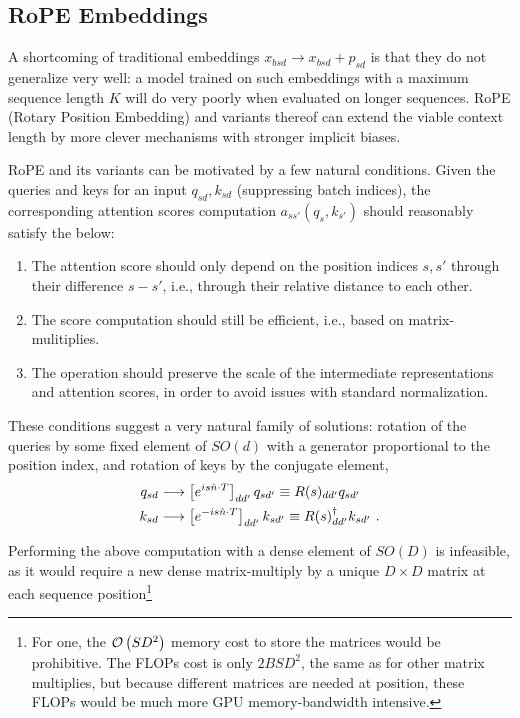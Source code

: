 \documentclass[11pt]{article}
\begin{document}
\subsection{RoPE Embeddings}

A shortcoming of traditional embeddings $ x _{ bsd } \longrightarrow x _{ bsd } + p _{ sd } $ is
that they do not generalize very well: a model trained on such embeddings with a maximum sequence
length $ K $ will do very poorly when evaluated on longer sequences. RoPE (Rotary Position
Embedding) \cite{su2022roformer} and variants thereof can extend the viable context length by more
clever mechanisms with stronger implicit biases.

RoPE and its variants can be motivated by a few natural conditions.  Given the queries and keys for
an input $ q _{ sd }, k _{ sd } $ (suppressing batch indices), the corresponding attention scores
computation $ a _{ ss' }\left ( q _{ s }, k _{ s' } \right ) $ should reasonably satisfy the below:
\begin{enumerate}
	\item The attention score should only depend on the position indices $ s, s' $ through their difference
	      $ s-s' $, i.e., through their relative distance to each other.
	\item The score computation should still be efficient, i.e., based on matrix-mulitiplies.
	\item The operation should preserve the scale of the intermediate representations and attention
	      scores, in order to avoid issues with standard normalization.
\end{enumerate}
These conditions suggest a very natural family of solutions: rotation of the queries by some fixed
element of $ SO(d) $ with a generator proportional to the position index, and rotation of keys by
the conjugate element,
\begin{align}
	q _{ sd } & \longrightarrow \left [e^{ i s \hat{n}\cdot T }\right ]_{ d d' } q _{ sd' } \equiv R(s) _{ d d' } q _{ sd' } \nonumber\\
	k _{ sd } & \longrightarrow \left [e^{ -i s \hat{n}\cdot T }\right ]_{ d d' } k _{ sd' } \equiv  R(s)^{ \dagger } _{ d d' } k _{ sd' } \ . \label{eq_rope}
\end{align}

Performing the above computation with a dense element of $ SO(D) $ is infeasible, as it would require
a new dense matrix-multiply by a unique $ D \times D $ matrix at each sequence
position\footnote{For one, the $ \mathcal{O} \left( SD ^{ 2 } \right)  $ memory cost to store the matrices
    would be prohibitive. The FLOPs cost is only $ 2BSD ^{ 2 } $, the same as for other matrix
    multiplies, but because different matrices are needed at position, these FLOPs would be much more
    GPU memory-bandwidth intensive.
}
\end{document}
